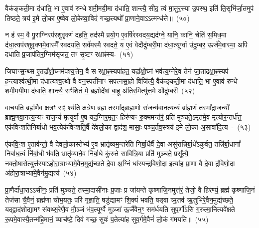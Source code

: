 वैक॑ङ्कती॒मा द॑धाति॒ भा ए॒वाव॑ रुन्धे शमी॒मयी॒मा द॑धाति॒ शान्त्यै॒ सीद॒ त्वं मा॒तुर॒स्या उ॒पस्थ॒ इति॑ ति॒सृभि॑र्जा॒तमुप॑ तिष्ठते॒ त्रय॑ इ॒मे लो॒का ए॒ष्वे॑व लो॒केष्वा॒विदं॑ गच्छ॒त्यथो᳚ प्रा॒णाने॒वा\-ऽऽ\-त्मन्ध॑त्ते॥~(५०)\ip

{}

न ह॑ स्म॒ वै पु॒राग्निरप॑रशुवृक्णं दहति॒ तद॑स्मै प्रयो॒ग ए॒वर्\mbox{}षि॑रस्वदय॒द्यद॑ग्ने॒ यानि॒ कानि॒ चेति॑ स॒मिध॒मा द॑धा॒त्यप॑रशुवृक्णमे॒वास्मै᳚ स्वदयति॒ सर्व॑मस्मै स्वदते॒ य ए॒वं वेदौदु॑म्बरी॒मा द॑धा॒त्यूर्ग्वा उ॑दु॒म्बर॒ ऊर्ज॑मे॒वास्मा॒ अपि॑ दधाति प्र॒जा\-प॑तिर॒ग्निम॑सृजत॒ तꣳ सृ॒ष्टꣳ \mbox{रक्षाꣴ॑स्य-~(५१)\ip}

जिघाꣳस॒न्थ्स ए॒तद्रा᳚क्षो॒घ्नम॑पश्य॒त्तेन॒ वै स रक्षा॒ꣴ॒स्यपा॑हत॒ यद्रा᳚क्षो॒घ्नं भव॑त्य॒ग्नेरे॒व तेन॑ जा॒ताद्रक्षा॒ꣴ॒स्यप॑ ह॒न्त्याश्व॑त्थी॒मा द॑धात्यश्व॒त्थो वै वन॒स्पती॑नाꣳ सपत्नसा॒हो विजि॑त्यै॒ वैक॑ङ्कती॒मा द॑धाति॒ भा ए॒वाव॑ रुन्धे शमी॒मयी॒मा द॑धाति॒ शान्त्यै॒ सꣳ॑शितं मे॒ ब्रह्मोदे॑षां बा॒हू अ॑तिर॒मित्यु॑त्त॒मे औदु॑म्बरी~(५२)\ip

वाचयति॒ ब्रह्म॑णै॒व क्ष॒त्रꣳ सꣴ श्य॑ति क्ष॒त्रेण॒ ब्रह्म॒ तस्मा᳚द्\-ब्राह्म॒णो रा॑ज॒न्य॑वा॒नत्य॒न्यं ब्रा᳚ह्म॒णं तस्मा᳚द्\-राज॒न्यो᳚ ब्राह्म॒णवा॒नत्य॒न्यꣳ रा॑ज॒न्यं॑ मृ॒त्युर्वा ए॒ष यद॒ग्निर॒मृत॒ꣳ॒ हिर॑ण्यꣳ रु॒क्ममन्त॑रं॒ प्रति॑ मुञ्चते॒\-ऽमृत॑मे॒व मृ॒त्योर॒न्तर्ध॑त्त॒ एक॑विꣳशतिनिर्बाधो भव॒त्येक॑विꣳशति॒र्वै दे॑वलो॒का द्वाद॑श॒ मासाः॒ पञ्च॒र्तव॒स्त्रय॑ इ॒मे लो॒का अ॒सावा॑दि॒त्य~-~(५३)\ip

ए॑कवि॒ꣳ॒श ए॒ताव॑न्तो॒ वै दे॑वलो॒कास्तेभ्य॑ ए॒व भ्रातृ॑व्यम॒न्तरे॑ति निर्बा॒धैर्वै दे॒वा असु॑रान्निर्बा॒धे॑\-ऽकुर्वत॒ तन्नि॑र्बा॒धानां᳚ निर्बाध॒त्वं नि॑र्बा॒धी भ॑वति॒ भ्रातृ॑व्याने॒व नि॑र्बा॒धे कु॑रुते सावित्रि॒या प्रति॑ मुञ्चते॒ प्रसू᳚त्यै॒ नक्तो॒षासेत्युत्त॑रयाऽहोरा॒त्राभ्या॑\-मे॒वैन॒मुद्य॑च्छते दे॒वा अ॒ग्निं धा॑रयन्द्रविणो॒दा इत्या॑ह प्रा॒णा वै दे॒वा द्र॑विणो॒दा अ॑होरा॒त्राभ्या॑मे॒वैन॑मु॒द्यत्य॑~(५४)\ip

प्रा॒णैर्दा॑धा॒रा\-ऽऽसी॑नः॒ प्रति॑ मुञ्चते॒ तस्मा॒दासी॑नाः प्र॒जाः प्र जा॑यन्ते कृष्णाजि॒नमुत्त॑रं॒ तेजो॒ वै हिर॑ण्यं॒ ब्रह्म॑ कृष्णाजि॒नं तेज॑सा चै॒वैनं॒ ब्रह्म॑णा चोभ॒यतः॒ परि॑ गृह्णाति॒ षडु॑द्यामꣳ शि॒क्यं॑ भवति॒ षड्वा ऋ॒तव॑ ऋ॒तुभि॑रे॒वैन॒मुद्य॑च्छते॒ यद्द्वाद॑शोद्यामꣳ संवथ्स॒रेणै॒व मौ॒ञ्जं भ॑व॒त्यूर्ग्वै मुञ्जा॑ ऊ॒र्जैवैन॒ꣳ॒ सम॑र्धयति सुप॒र्णो॑\-ऽसि ग॒रुत्मा॒नित्यवे᳚क्षते रू॒पमे॒वास्यै॒तन्म॑हि॒मानं॒ व्याच॑ष्टे॒ दिवं॑ गच्छ॒ सुवः॑ प॒तेत्या॑ह सुव॒र्गमे॒वैनं॑ लो॒कं ग॑मयति॥~(५५)\ip

{\anuvakamend[{रक्षा॒ꣴ॒स्यौदु॑म्बरी आदि॒त्य उ॒द्यत्य॒ स़ञ्चतु॑र्विꣳशतिश्च}]}%

